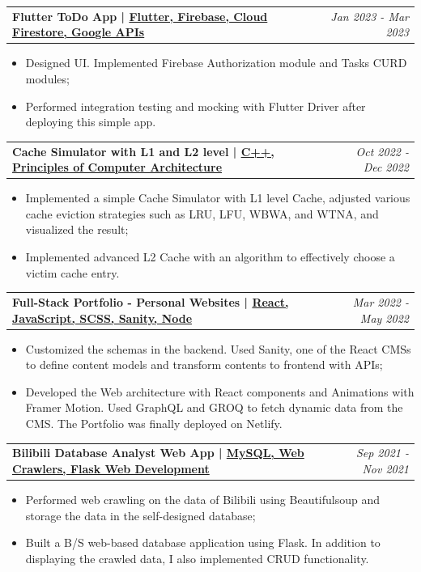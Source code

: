 \documentclass[a4paper,20pt]{article}
\makeatletter
\newcommand{\resumeItemWithoutSemicolon}[2]{
  \vspace{-1pt}\item\small{
  \begin{tabular*}{0.97\textwidth}{l@{\extracolsep{\fill}}r}
    \textbf{#1} & \textit{#2} \\
  \end{tabular*}\vspace{-13pt}
  }
}
\newcommand{\resumeItemWithoutTitle}[1]{
  \item\small{
    {#1} \vspace{-2pt}
  }
}
\newcommand{\resumeSubItemTopLevel}[2]{\resumeItemWithoutSemicolon{#1}{#2}\vspace{-5pt}}
\newcommand{\resumeItemListStart}{\begin{itemize}}
\newcommand{\resumeItemListEnd}{\end{itemize}\vspace{-5pt}}
\makeatother
\begin{document}
    \resumeSubItemTopLevel{\small{Flutter ToDo App} | \href{https://github.com/Guo-lab/Flutter_exploration/tree/main/tutorials/flutter_app_todo}{Flutter, Firebase, Cloud Firestore, Google APIs \faIcon{github}}}{Jan 2023 - Mar 2023}
    \resumeItemListStart
        \resumeItemWithoutTitle{Designed UI. Implemented Firebase Authorization module and Tasks CURD modules;}
        \vspace{-2pt}
        \resumeItemWithoutTitle{Performed integration testing and mocking with Flutter Driver after deploying this simple app.}
    \resumeItemListEnd


    \resumeSubItemTopLevel{Cache Simulator with L1 and L2 level | \href{https://github.com/Guo-lab/cache-simulator}{C++, Principles of Computer Architecture \faIcon{github}}}{Oct 2022 - Dec 2022}
    \resumeItemListStart
        \resumeItemWithoutTitle{Implemented a simple Cache Simulator with L1 level Cache, adjusted various cache eviction strategies such as LRU, LFU, WBWA, and WTNA, and visualized the result;}
        \vspace{-2pt}
        \resumeItemWithoutTitle{Implemented advanced L2 Cache with an algorithm to effectively choose a victim cache entry.}
    \resumeItemListEnd

    \resumeSubItemTopLevel{\small{Full-Stack Portfolio - Personal Websites} | \href{https://github.com/Guo-lab/Full-Stack-Portfolio}{React, JavaScript, SCSS, Sanity, Node \faIcon{github}} }{Mar 2022 - May 2022}
    \resumeItemListStart
        \resumeItemWithoutTitle{Customized the schemas in the backend. Used Sanity, one of the React CMSs to define content models and transform contents to frontend with APIs;}
        \vspace{-2pt}
        \resumeItemWithoutTitle{Developed the Web architecture with React components and Animations with Framer Motion. Used GraphQL and GROQ to fetch dynamic data from the CMS. The Portfolio was finally deployed on Netlify.}
    \resumeItemListEnd

    \resumeSubItemTopLevel{\small{Bilibili Database Analyst Web App} {| \href{https://github.com/Guo-lab/BilibiliDatabase}{MySQL, Web Crawlers, Flask Web Development \faIcon{github}}}}{Sep 2021 - Nov 2021}
    \resumeItemListStart
        \resumeItemWithoutTitle{Performed web crawling on the data of Bilibili using Beautifulsoup and storage the data in the self-designed database;}
        \vspace{-2pt}
        \resumeItemWithoutTitle{Built a B/S web-based database application using Flask. In addition to displaying the crawled data, I also implemented CRUD functionality.}
    \resumeItemListEnd
\end{document}

